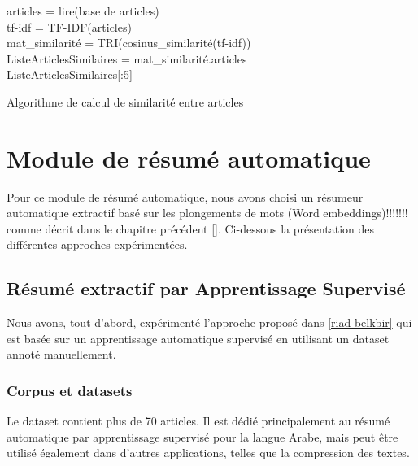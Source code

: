     \begin{algorithm2e}[H]
        \SetAlgoLined
        articles = lire(base de articles)\\
        tf-idf = TF-IDF(articles)\\
        mat\_similarité = TRI(cosinus\_similarité(tf-idf))\\
        ListeArticlesSimilaires = mat\_similarité.articles\\
        \Return ListeArticlesSimilaires[:5]
        \caption{Algorithme de calcul de similarité entre articles}
    \end{algorithm2e}
\section{Module de résumé automatique}
Pour ce module de résumé automatique, nous avons choisi un résumeur automatique extractif \cite{notreresume} basé sur les plongements de mots (Word embeddings)!!!!!!! comme décrit dans le chapitre précédent \autoref{}.
Ci-dessous la présentation des différentes approches expérimentées.
    \subsection{Résumé extractif par Apprentissage Supervisé}
    Nous avons, tout d'abord, expérimenté l'approche proposé dans \ref{riad-belkbir} qui est basée sur un apprentissage automatique supervisé en utilisant un dataset annoté manuellement. 
        \subsubsection{Corpus et datasets}
        Le dataset contient plus de 70 articles. Il est dédié principalement au résumé automatique par apprentissage supervisé pour la langue Arabe, mais peut être utilisé également dans d'autres applications, telles que la compression des textes.

